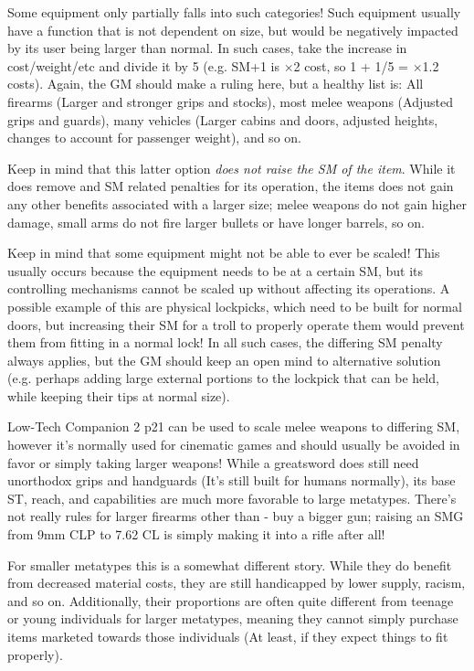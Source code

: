 \begin{multicols*}{3}
	Some equipment only partially falls into such categories! Such equipment usually have a function that is not dependent on size, but would be negatively impacted by its user being larger than normal. In such cases, take the increase in cost/weight/etc and divide it by 5 (e.g. SM+1 is $\times$2 cost, so 1 + 1/5 = $\times$1.2 costs). Again, the GM should make a ruling here, but a healthy list is: All firearms (Larger and stronger grips and stocks), most melee weapons (Adjusted grips and guards), many vehicles (Larger cabins and doors, adjusted heights, changes to account for passenger weight), and so on.
	
	Keep in mind that this latter option \textit{does not raise the SM of the item}. While it does remove and SM related penalties for its operation, the items does not gain any other benefits associated with a larger size; melee weapons do not gain higher damage, small arms do not fire larger bullets or have longer barrels, so on.
	
	Keep in mind that some equipment might not be able to ever be scaled! This usually occurs because the equipment needs to be at a certain SM, but its controlling mechanisms cannot be scaled up without affecting its operations. A possible example of this are physical lockpicks, which need to be built for normal doors, but increasing their SM for a troll to properly operate them would prevent them from fitting in a normal lock! In all such cases, the differing SM penalty always applies, but the GM should keep an open mind to alternative solution (e.g. perhaps adding large external portions to the lockpick that can be held, while keeping their tips at normal size).
	
	Low-Tech Companion 2 p21 can be used to scale melee weapons to differing SM, however it's normally used for cinematic games and should usually be avoided in favor or simply taking larger weapons! While a greatsword does still need unorthodox grips and handguards (It's still built for humans normally), its base ST, reach, and capabilities are much more favorable to large metatypes. There's not really rules for larger firearms other than - buy a bigger gun; raising an SMG from 9mm CLP to 7.62 CL is simply making it into a rifle after all!
	
	For smaller metatypes this is a somewhat different story. While they do benefit from decreased material costs, they are still handicapped by lower supply, racism, and so on. Additionally, their proportions are often quite different from teenage or young individuals for larger metatypes, meaning they cannot simply purchase items marketed towards those individuals (At least, if they expect things to fit properly).
	

\end{multicols*}
